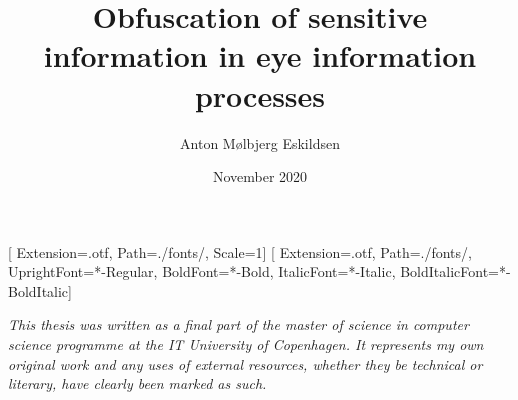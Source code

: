 \documentclass[11pt, a4paper, twoside]{report}
\title{Obfuscation of sensitive information in eye information processes}
\author{Anton Mølbjerg Eskildsen}
\date{November 2020}
\begin{document}
[
Extension={.otf},
Path=./fonts/,
Scale=1]
\setmainfont{STIX2Text}[
Extension={.otf},
Path=./fonts/,
UprightFont={*-Regular},
BoldFont={*-Bold},
ItalicFont={*-Italic},
BoldItalicFont={*-BoldItalic}]

\maketitle


\tableofcontents

\newpage
\begin{center}
\emph{This thesis was written as a final part of the master of science in computer science programme at the IT University of Copenhagen. It represents my own original work and any uses of external resources, whether they be technical or literary, have clearly been marked as such.}
\end{center}
\newpage

















\printbibliography

\newpage

\printnoidxglossaries
\printnomenclature[1in]

\newpage

\end{document}
